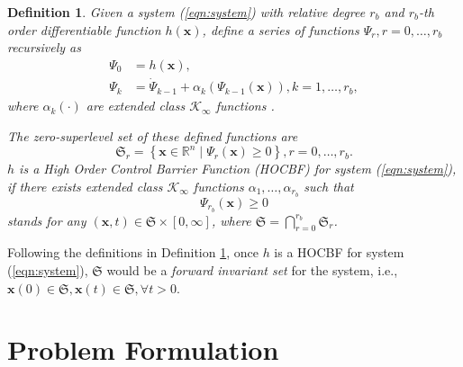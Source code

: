 \documentclass{ifacconf}
\newtheorem{definition}{Definition}
\begin{document}
\begin{definition}\label{def:HOCBF}
   Given a system (\ref{eqn:system}) with relative degree $r_b$ and $r_b$-th order differentiable function $h(\boldsymbol{x})$, define a series of functions $\Psi_r, r = 0, \dots, r_b$ recursively as
   \begin{equation} \label{eqn:cbfRecursive}
     \begin{aligned}
       \Psi_0 &= h(\boldsymbol{x}), \\
       \Psi_k &= \dot{\Psi}_{k-1} + \alpha_k\left( \Psi_{k-1}(\boldsymbol{x}) \right), k = 1,\dots,r_b,
     \end{aligned}
   \end{equation}
   where $\alpha_k(\cdot)$ are extended class $\mathcal{K}_{\infty}$ functions \footnotemark. 
   
   \par The zero-superlevel set of these defined functions are
   \begin{equation}
     \mathfrak{S}_r = \left\{ \boldsymbol{x} \in \mathbb{R}^n \mid \Psi_r(\boldsymbol{x}) \ge 0 \right\}, r = 0,\dots,r_b.
   \end{equation}
   $h$ is a \textit{High Order Control Barrier Function (HOCBF)} for system (\ref{eqn:system}), if there exists extended class $\mathcal{K}_{\infty}$ functions $\alpha_1, \dots, \alpha_{r_b}$ such that
   \begin{equation} \label{eqn:cbfConstraint}
     \Psi_{r_b}(\boldsymbol{x}) \ge 0
   \end{equation}
   stands for any $(\boldsymbol{x},t) \in \mathfrak{S} \times [0,\infty]$, where $\mathfrak{S} = \bigcap_{r = 0}^{r_b} \mathfrak{S}_r$. 

\end{definition}

\begin{thm} \label{thm:HOCBF}
   \par Following the definitions in Definition \ref{def:HOCBF}, once $h$ is a HOCBF for system (\ref{eqn:system}), $\mathfrak{S}$ would be a \textit{forward invariant set} for the system, i.e., $\boldsymbol{x}(0) \in \mathfrak{S}, \boldsymbol{x}(t) \in \mathfrak{S}, \forall t > 0$.
\end{thm}

\section{Problem Formulation}\label{sec:problemFormulation}
\end{document}
